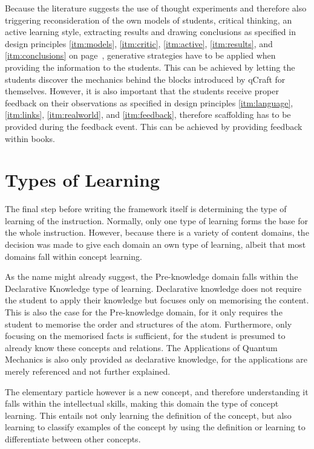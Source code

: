 \documentclass[11pt,twoside]{report} %
\begin{document}
Because the literature suggests the use of thought experiments and therefore also triggering reconsideration of the own models of students, critical thinking, an active learning style, extracting results and drawing conclusions as specified in design principles \ref{itm:models}, \ref{itm:critic}, \ref{itm:active}, \ref{itm:results}, and \ref{itm:conclusions} on page~\pageref{itm:models}, generative strategies have to be applied when providing the information to the students. This can be achieved by letting the students discover the mechanics behind the blocks introduced by qCraft for themselves. However, it is also important that the students receive proper feedback on their observations as specified in design principles \ref{itm:language}, \ref{itm:links}, \ref{itm:realworld}, and \ref{itm:feedback}, therefore scaffolding has to be provided during the feedback event. This can be achieved by providing feedback within books.

\section{Types of Learning}

The final step before writing the framework itself is determining the type of learning of the instruction. Normally, only one type of learning forms the base for the whole instruction. However, because there is a variety of content domains, the decision was made to give each domain an own type of learning, albeit that most domains fall within concept learning.

As the name might already suggest, the Pre-knowledge domain falls within the Declarative Knowledge type of learning. Declarative knowledge does not require the student to apply their knowledge but focuses only on memorising the content. This is also the case for the Pre-knowledge domain, for it only requires the student to memorise the order and structures of the atom. Furthermore, only focusing on the memorised facts is sufficient, for the student is presumed to already know these concepts and relations. The Applications of Quantum Mechanics is also only provided as declarative knowledge, for the applications are merely referenced and not further explained.

The elementary particle however is a new concept, and therefore understanding it falls within the intellectual skills, making this domain the type of concept learning. This entails not only learning the definition of the concept, but also learning to classify examples of the concept by using the definition or learning to differentiate between other concepts.
\end{document}
